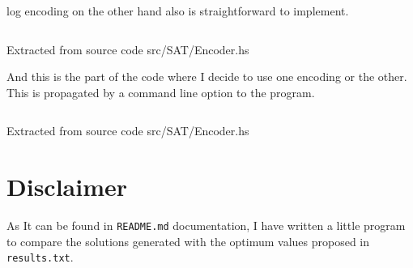 \documentclass[12pt, a4paper]{article}
\begin{document}
\acrlong{log} encoding on the other hand also is straightforward to implement.

\begin{listing}[H]
  \inputminted[firstline=76, lastline=85, linenos, breaklines]{haskell}{../src/SAT/Encoder.hs}
  \caption{Extracted from source code src/SAT/Encoder.hs}
  \label{src:sat:3}
\end{listing}

And this is the part of the code where I decide to use one encoding or the other. This is propagated by a command line option to the program.

\begin{listing}[H]
  \inputminted[firstline=49, lastline=52, linenos, breaklines]{haskell}{../src/SAT/Encoder.hs}
  \caption{Extracted from source code src/SAT/Encoder.hs}
  \label{src:sat:4}
\end{listing}

\section{Disclaimer}
As It can be found in \texttt{README.md} documentation, I have written a little program to compare the solutions generated with the optimum values proposed in \texttt{results.txt}.



\end{document}
